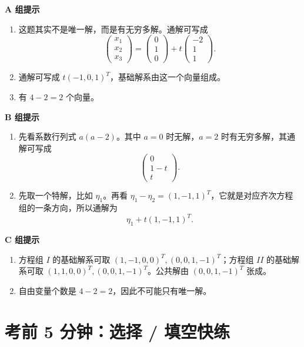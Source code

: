 \documentclass[11pt,oneside,UTF8]{ctexbook}
\begin{document}
\begin{summarybox}[答案提示]
\textbf{A 组提示}
\begin{enumerate}[label=\textbf{A\arabic*.}]
  \item 这题其实不是唯一解，而是有无穷多解。通解可写成
  \[
  \begin{pmatrix}
  x_1\\x_2\\x_3
  \end{pmatrix}
  =
  \begin{pmatrix}
  0\\1\\0
  \end{pmatrix}
  +
  t\begin{pmatrix}
  -2\\1\\1
  \end{pmatrix}.
  \]
  \item 通解可写成 \(t(-1,0,1)^T\)，基础解系由这一个向量组成。
  \item 有 \(4-2=2\) 个向量。
\end{enumerate}

\textbf{B 组提示}
\begin{enumerate}[label=\textbf{B\arabic*.}]
  \item 先看系数行列式 \(a(a-2)\)。其中 \(a=0\) 时无解，\(a=2\) 时有无穷多解，其通解可写成
  \[
  \begin{pmatrix}
  0\\1-t\\t
  \end{pmatrix}.
  \]
  \item 先取一个特解，比如 \(\eta_1\)。再看 \(\eta_1-\eta_2=(1,-1,1)^T\)，它就是对应齐次方程组的一条方向，所以通解为
  \[
  \eta_1+t(1,-1,1)^T.
  \]
\end{enumerate}

\textbf{C 组提示}
\begin{enumerate}[label=\textbf{C\arabic*.}]
  \item 方程组 \(I\) 的基础解系可取 \((1,-1,0,0)^T,(0,0,1,-1)^T\)；方程组 \(II\) 的基础解系可取 \((1,1,0,0)^T,(0,0,1,-1)^T\)。公共解由 \((0,0,1,-1)^T\) 张成。
  \item 自由变量个数是 \(4-2=2\)，因此不可能只有唯一解。
\end{enumerate}
\end{summarybox}

\section{考前 5 分钟：选择 / 填空快练}
\end{document}
